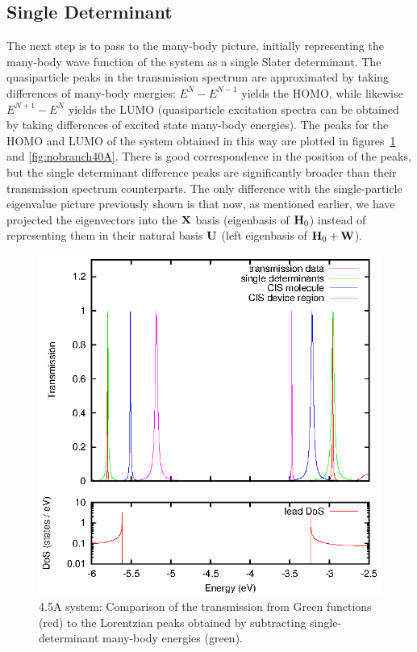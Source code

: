 \subsection{Single Determinant}
\label{subsec:SingleDeterminant}

The next step is to pass to the many-body picture, initially representing the
many-body wave function of the system as a single Slater determinant. The
quasiparticle peaks in the transmission spectrum are approximated by taking
differences of many-body energies: $E^N - E^{N-1}$ yields the \ac{HOMO}, while
likewise $E^{N+1} - E^N$ yields the \ac{LUMO} (quasiparticle excitation spectra
can be obtained by taking differences of excited state many-body energies).
The peaks for the \ac{HOMO} and \ac{LUMO} of the system obtained in this way
are plotted in figures~\ref{fig:nobranch45A} and \ref{fig:nobranch40A}.
There is good correspondence in the position of the peaks, but the single
determinant difference peaks are significantly broader than their transmission
spectrum counterparts. The only difference with the single-particle eigenvalue
picture previously shown is that now, as mentioned earlier, we have projected
the eigenvectors into the $\mathbf{X}$ basis (eigenbasis of $\mathbf{H}_0$) instead of
representing them in their natural basis $\mathbf{U}$ (left eigenbasis of
$\mathbf{H}_0 + \mathbf{W}$).

\begin{figure}[h]
	\begin{center}
		\includegraphics[width=0.9\linewidth]{figures/nobrsingles45A.eps}
	\end{center}
	\caption{4.5A system: Comparison of the transmission from Green
                 functions (red) to the Lorentzian peaks obtained by
                 subtracting single-determinant many-body energies (green).}
	\label{fig:nobranch45A}
\end{figure}

